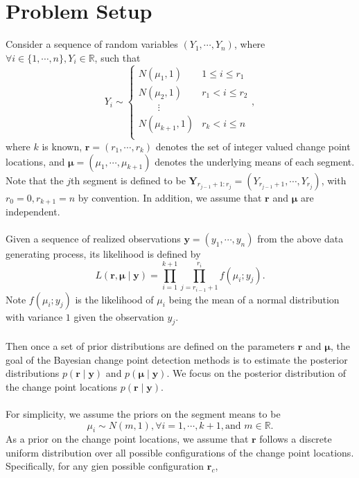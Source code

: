 

\section{Problem Setup}

Consider a sequence of random variables $(Y_1,\cdots,Y_n)$, where $\forall i \in \{1,\cdots,n\}, Y_i \in \mathbb{R}$, such that
\[
Y_i \sim \begin{cases}
N(\mu_1,1) & 1 \leq i \leq r_1 \\
N(\mu_2,1) & r_1 < i \leq r_2 \\
\quad \quad \vdots \\
N(\mu_{k+1},1) & r_k < i \leq n \\
\end{cases},
\]
where $k$ is known, $\bm{r} = (r_1,\cdots,r_k)$ denotes the set of integer valued change point locations, and $\bm{\mu} = (\mu_1,\cdots,\mu_{k+1})$ denotes the underlying means of each segment. Note that the $j$th segment is defined to be $\bm{Y}_{r_{j-1}+1 : r_j} = (Y_{r_{j-1}+1}, \cdots, Y_{r_j})$, with $r_0 = 0, r_{k+1} = n$ by convention. In addition, we assume that $\bm{r}$ and $\bm{\mu}$ are independent.\\\\
Given a sequence of realized observations $\bm{y} = (y_1,\cdots,y_n)$ from the above data generating process, its likelihood is defined by
\[
L( \bm{r}, \bm{\mu} \mid \bm{y} ) = \prod_{i=1}^{k+1}\prod_{j=r_{i-1}+1}^{r_i} f(\mu_i; y_j).
\]
Note $f(\mu_i; y_j)$ is the likelihood of $\mu_i$ being the mean of a normal distribution with variance $1$ given the observation $y_j$.\\\\
Then once a set of prior distributions are defined on the parameters $\bm{r}$ and $\bm{\mu}$, the goal of the Bayesian change point detection methods is to estimate the posterior distributions $p(\bm{r} \mid \bm{y})$ and $p(\bm{\mu} \mid \bm{y})$. We focus on the posterior distribution of the change point locations $p(\bm{r} \mid \bm{y})$.\\\\
For simplicity, we assume the priors on the segment means to be
\[
\mu_i \sim N(m, 1), \forall i=1,\cdots,k+1, \text{and } m\in \mathbb{R}.
\]
As a prior on the change point locations, we assume that $\bm{r}$ follows a discrete uniform distribution over all possible configurations of the change point locations. Specifically, for any gien possible configuration $\bm{r}_c$,
